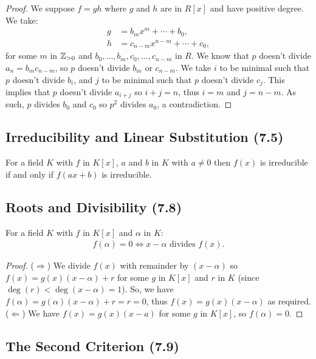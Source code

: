 \begin{proof}
    We suppose $f = gh$ where $g$ and $h$ are in $R[x]$ and have positive degree. We take:
    \begin{align*}
        g &= b_mx^m + \cdots + b_0, \\
        h &= c_{n - m}x^{n - m} + \cdots + c_0,
    \end{align*} for some $m$ in $\mathbb{Z}_{> 0}$ and $b_0, \ldots, b_m, c_0, \ldots, c_{n - m}$
    in $R$. We know that $p$ doesn't divide $a_n = b_mc_{n - m}$, so $p$ doesn't divide
    $b_m$ or $c_{n - m}$. We take $i$ to be minimal such that $p$ doesn't divide $b_i$,
    and $j$ to be minimal such that $p$ doesn't divide $c_j$. This implies that $p$ doesn't
    divide $a_{i + j}$ so $i + j = n$, thus $i = m$ and $j = n - m$. As such,
    $p$ divides $b_0$ and $c_0$ so $p^2$ divides $a_0$, a contradiction.
\end{proof}

\subsection{Irreducibility and Linear Substitution (7.5)} \label{7.5}

For a field $K$ with $f$ in $K[x]$, $a$ and $b$ in $K$ with $a \neq 0$ then
$f(x)$ is irreducible if and only if $f(ax + b)$ is irreducible. 

\subsection{Roots and Divisibility (7.8)} \label{7.8}

For a field $K$ with $f$ in $K[x]$ and $\alpha$ in $K$: \begin{align*}
    f(\alpha) = 0 \Longleftrightarrow x - \alpha \text{ divides } f(x).
\end{align*}

\begin{proof}
    ($\Longrightarrow$) We divide $f(x)$ with remainder by $(x - \alpha)$
    so $f(x) = g(x)(x - \alpha) + r$ for some $g$ in $K[x]$ and $r$ in $K$ (since
    $\deg(r) < \deg(x - \alpha) = 1$). So, we have
    $f(\alpha) = g(\alpha)(x - \alpha) + r = r = 0$, thus $f(x) = g(x)(x - \alpha)$
    as required.
    \bs
    ($\Longleftarrow$) We have $f(x) = g(x)(x - a)$ for some $g$ in $K[x]$,
    so $f(\alpha) = 0$.
\end{proof}

\subsection{The Second Criterion (7.9)} \label{7.9}

